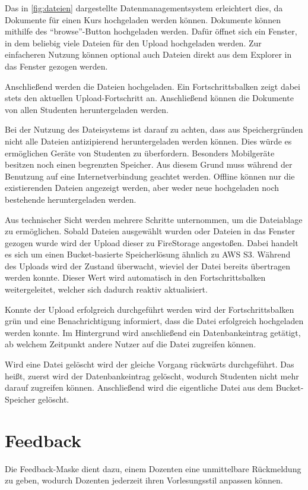 Das in \autoref{fig:dateien} dargestellte Datenmanagementsystem erleichtert dies, da Dokumente für einen Kurs hochgeladen werden können.
Dokumente können mithilfe des \enquote{browse}-Button hochgeladen werden.
Dafür öffnet sich ein Fenster, in dem beliebig viele Dateien für den Upload hochgeladen werden.
Zur einfacheren Nutzung können optional auch Dateien direkt aus dem Explorer in das Fenster gezogen werden.

Anschließend werden die Dateien hochgeladen.
Ein Fortschrittsbalken zeigt dabei stets den aktuellen Upload-Fortschritt an.
Anschließend können die Dokumente von allen Studenten heruntergeladen werden.

Bei der Nutzung des Dateisystems ist darauf zu achten, dass aus Speichergründen nicht alle Dateien antizipierend heruntergeladen werden können.
Dies würde es ermöglichen Geräte von Studenten zu überfordern.
Besonders Mobilgeräte besitzen noch einen begrenzten Speicher.
Aus diesem Grund muss während der Benutzung auf eine Internetverbindung geachtet werden.
Offline können nur die existierenden Dateien angezeigt werden, aber weder neue hochgeladen noch bestehende heruntergeladen werden.


Aus technischer Sicht werden mehrere Schritte unternommen, um die Dateiablage zu ermöglichen.
Sobald Dateien ausgewählt wurden oder Dateien in das Fenster gezogen wurde wird der Upload dieser zu FireStorage angestoßen.
Dabei handelt es sich um einen Bucket-basierte Speicherlösung ähnlich zu AWS S3.
Während des Uploads wird der Zustand überwacht, wieviel der Datei bereits übertragen werden konnte.
Dieser Wert wird automatisch in den Fortschrittsbalken weitergeleitet, welcher sich dadurch reaktiv aktualisiert.


Konnte der Upload erfolgreich durchgeführt werden wird der Fortschrittsbalken grün und eine Benachrichtigung informiert, dass die Datei erfolgreich hochgeladen werden konnte.
Im Hintergrund wird anschließend ein Datenbankeintrag getätigt, ab welchem Zeitpunkt andere Nutzer auf die Datei zugreifen können.

Wird eine Datei gelöscht wird der gleiche Vorgang rückwärts durchgeführt.
Das heißt, zuerst wird der Datenbankeintrag gelöscht, wodurch Studenten nicht mehr darauf zugreifen können.
Anschließend wird die eigentliche Datei aus dem Bucket-Speicher gelöscht.


\section{Feedback}\label{sec:Feedback}
Die Feedback-Maske dient dazu, einem Dozenten eine unmittelbare Rückmeldung zu geben, wodurch Dozenten jederzeit ihren Vorlesungsstil anpassen können.

